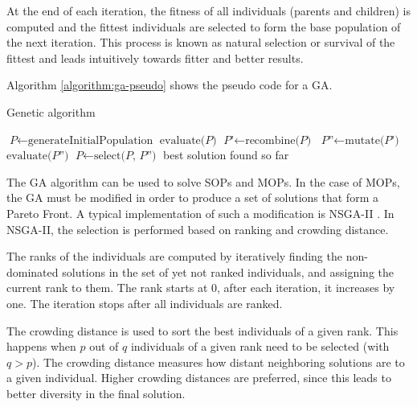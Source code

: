 
At the end of each iteration, the fitness of all individuals (parents and children) is computed and the fittest individuals are selected to form the base population of the next iteration. This process is known as natural selection or survival of the fittest and leads intuitively towards fitter and better results. 

Algorithm \ref{algorithm:ga-pseudo} shows the pseudo code for a GA.

\begin{algorithm}
  \caption{Genetic algorithm}\label{algorithm:ga-pseudo}
  \begin{algorithmic}[1]
  \State $\textit{P} \gets \text{generateInitialPopulation}$
  \State $\text{evaluate(} \textit{P} \text{)}$
    \State $\textit{P'} \gets \text{recombine(} \textit{P} \text{)}$
    \State $\textit{P''} \gets \text{mutate(} \textit{P'} \text{)}$
    \State $\text{evaluate(} \textit{P''} \text{)}$
    \State $\textit{P} \gets \text{select(} \textit{P, P''} \text{)}$
  \EndWhile
  \Return best solution found so far
  \EndProcedure
  \end{algorithmic}
\end{algorithm}

The GA algorithm can be used to solve SOPs and MOPs. In the case of MOPs, the GA must be modified in order to produce a set of solutions that form a Pareto Front. A typical implementation of such a modification is NSGA-II \cite{deb2002fast}. In NSGA-II, the selection is performed based on ranking and crowding distance.

The ranks of the individuals are computed by iteratively finding the non-dominated solutions in the set of yet not ranked individuals, and assigning the current rank to them. The rank starts at 0, after each iteration, it increases by one. The iteration stops after all individuals are ranked.

The crowding distance is used to sort the best individuals of a given rank. This happens when $p$ out of $q$ individuals of a given rank need to be selected (with $q > p$). The crowding distance measures how distant neighboring solutions are to a given individual. Higher crowding distances are preferred, since this leads to better diversity in the final solution.

